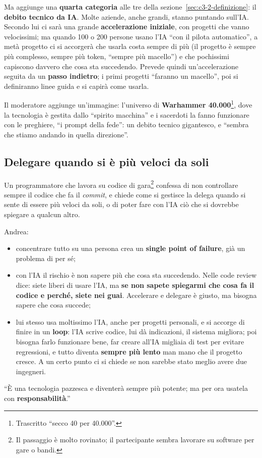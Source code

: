 Ma aggiunge una \textbf{quarta categoria} alle tre della
sezione~\ref{sec:c3-2-definizione}: il \textbf{debito tecnico da IA}. Molte aziende,
anche grandi, stanno puntando sull'IA. Secondo lui ci sarà una grande
\textbf{accelerazione iniziale}, con progetti che vanno velocissimi; ma quando 100 o
200 persone usano l'IA ``con il pilota automatico'', a metà progetto ci si
accorgerà che usarla costa sempre di più (il progetto è sempre più complesso, sempre
più token, ``sempre più macello'') e che pochissimi capiscono davvero che cosa sta
succedendo. Prevede quindi un'accelerazione seguita da un \textbf{passo indietro};
i primi progetti ``faranno un macello'', poi si definiranno linee guida e si capirà
come usarla.

Il moderatore aggiunge un'immagine: l'universo di \textbf{Warhammer
40.000}\footnote{Trascritto ``secco 40 per 40.000''.}, dove la tecnologia è gestita
dallo ``spirito macchina'' e i sacerdoti la fanno funzionare con le preghiere,
``i prompt della fede'': un debito tecnico gigantesco, e ``sembra che stiamo andando
in quella direzione''.

\subsection{Delegare quando si è più veloci da soli}

Un programmatore che lavora su codice di gara\footnote{Il passaggio è molto
rovinato; il partecipante sembra lavorare su software per gare o bandi.} confessa
di non controllare sempre il codice che fa il \emph{commit}, e chiede come si
gestisce la delega quando si sente di essere più veloci da soli, o di poter fare
con l'IA ciò che si dovrebbe spiegare a qualcun altro.

Andrea:
\begin{itemize}
  \item concentrare tutto su una persona crea un \textbf{single point of
        failure}, già un problema di per sé;
  \item con l'IA il rischio è non sapere più che cosa sta succedendo. Nelle code
        review dice: siete liberi di usare l'IA, ma \textbf{se non sapete
        spiegarmi che cosa fa il codice e perché, siete nei guai}. Accelerare e
        delegare è giusto, ma bisogna sapere che cosa succede;
  \item lui stesso usa moltissimo l'IA, anche per progetti personali, e si accorge
        di finire in un \textbf{loop}: l'IA scrive codice, lui dà indicazioni, il
        sistema migliora; poi bisogna farlo funzionare bene, far creare all'IA
        migliaia di test per evitare regressioni, e tutto diventa
        \textbf{sempre più lento} man mano che il progetto cresce. A un certo punto
        ci si chiede se non sarebbe stato meglio avere due ingegneri.
\end{itemize}
``È una tecnologia pazzesca e diventerà sempre più potente; ma per ora usatela con
\textbf{responsabilità}.''

